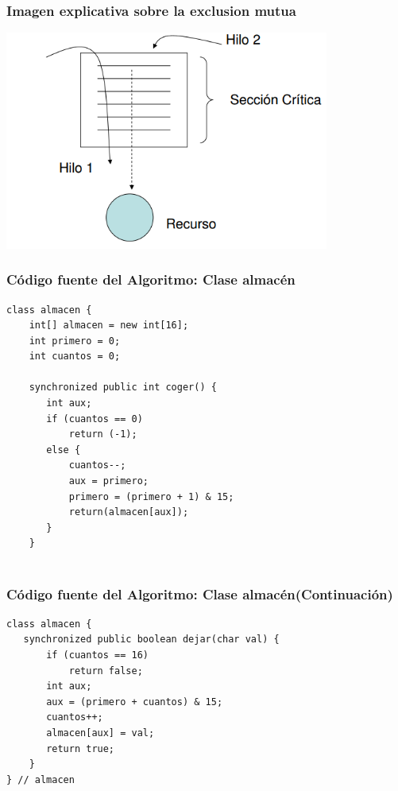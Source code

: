 \documentclass{beamer}
\begin{document}
\begin{frame}[fragile]

\frametitle{Imagen explicativa sobre la exclusion mutua} \vspace*{-0.8 cm}
 \includegraphics[width=0.8\textwidth]{exclmu.png}

\end{frame}


\begin{frame}[fragile]

\frametitle{Código fuente del Algoritmo: Clase almacén}\vspace*{-0.3cm}

\begin{lstlisting}
class almacen { 
    int[] almacen = new int[16]; 
    int primero = 0; 
    int cuantos = 0;

    synchronized public int coger() { 
       int aux; 
       if (cuantos == 0) 
           return (-1); 
       else { 
           cuantos--; 
           aux = primero; 
           primero = (primero + 1) & 15; 
           return(almacen[aux]); 
       } 
    }
  
\end{lstlisting}
\end{frame}

\begin{frame}[fragile]

\frametitle{Código fuente del Algoritmo: Clase almacén(Continuación)}\vspace*{-0.5cm}

\begin{lstlisting}
class almacen { 
   synchronized public boolean dejar(char val) { 
       if (cuantos == 16) 
           return false; 
       int aux; 
       aux = (primero + cuantos) & 15; 
       cuantos++; 
       almacen[aux] = val; 
       return true; 
    } 
} // almacen


\end{lstlisting}
\end{frame}
\end{document}
